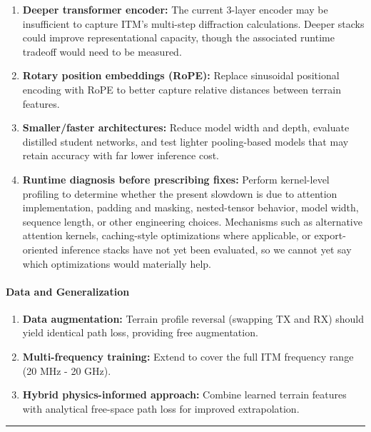 \documentclass[
]{article}
\begin{document}
\begin{enumerate}
\def\labelenumi{\arabic{enumi}.}
\setcounter{enumi}{3}
\item
  \textbf{Deeper transformer encoder:} The current 3-layer encoder may
  be insufficient to capture ITM's multi-step diffraction calculations.
  Deeper stacks could improve representational capacity, though the
  associated runtime tradeoff would need to be measured.
\item
  \textbf{Rotary position embeddings (RoPE):} Replace sinusoidal
  positional encoding with RoPE to better capture relative distances
  between terrain features.
\item
  \textbf{Smaller/faster architectures:} Reduce model width and depth,
  evaluate distilled student networks, and test lighter pooling-based
  models that may retain accuracy with far lower inference cost.
\item
  \textbf{Runtime diagnosis before prescribing fixes:} Perform
  kernel-level profiling to determine whether the present slowdown is
  due to attention implementation, padding and masking, nested-tensor
  behavior, model width, sequence length, or other engineering choices.
  Mechanisms such as alternative attention kernels, caching-style
  optimizations where applicable, or export-oriented inference stacks
  have not yet been evaluated, so we cannot yet say which optimizations
  would materially help.
\end{enumerate}

\paragraph{Data and Generalization}\label{data-and-generalization}

\begin{enumerate}
\def\labelenumi{\arabic{enumi}.}
\setcounter{enumi}{7}
\item
  \textbf{Data augmentation:} Terrain profile reversal (swapping TX and
  RX) should yield identical path loss, providing free augmentation.
\item
  \textbf{Multi-frequency training:} Extend to cover the full ITM
  frequency range (20 MHz - 20 GHz).
\item
  \textbf{Hybrid physics-informed approach:} Combine learned terrain
  features with analytical free-space path loss for improved
  extrapolation.
\end{enumerate}

\begin{center}\rule{0.5\linewidth}{0.5pt}\end{center}
\end{document}
